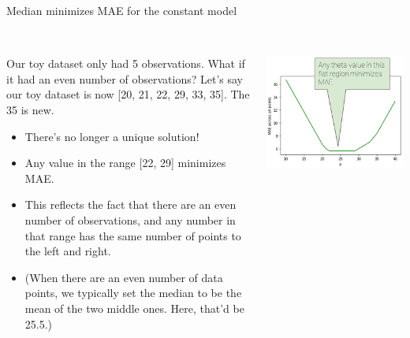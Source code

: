 \documentclass[aspectratio=169]{../latex_main/tntbeamer}  %
\begin{document}
	\begin{frame}{Median minimizes MAE for the constant model}
	    \begin{columns}
	        \begin{column}{.6\textwidth}
	                \\
	                 Our toy dataset only had 5 observations. What if it had an even number of observations? Let’s say our toy dataset is now [20, 21, 22, 29, 33, 35]. The 35 is new.
	                 \begin{itemize}
	                     \item There’s no longer a unique solution!
	                     \item Any value in the range [22, 29] minimizes MAE.
	                     \item This reflects the fact that there are an even number of observations, and any number in that range has the same number of points to the left and right.
	                     \item (When there are an even number of data points, we typically set the median to be the mean of the two middle ones. Here, that’d be 25.5.)
	                 \end{itemize}
	        \end{column}
	        
	        
	        \begin{column}{.4\textwidth}
	              \\
	              \includegraphics[scale=.4]{Bild44}
  
	        \end{column}
	    \end{columns}
	\end{frame}
\end{document}
